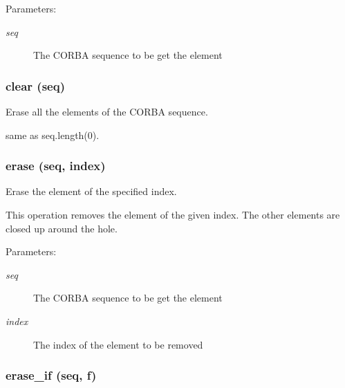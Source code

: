 \begin{Desc}
\item[Parameters:]
\begin{description}
\item[{\em seq}]The CORBA sequence to be get the element\end{description}
\end{Desc}
\subsubsection{\setlength{\rightskip}{0pt plus 5cm}clear (seq)}\label{CORBA__SeqUtil_8py_a9}


Erase all the elements of the CORBA sequence. 

same as seq.length(0).
\subsubsection{\setlength{\rightskip}{0pt plus 5cm}erase (seq, index)}\label{CORBA__SeqUtil_8py_a7}


Erase the element of the specified index. 

This operation removes the element of the given index. The other elements are closed up around the hole.

\begin{Desc}
\item[Parameters:]
\begin{description}
\item[{\em seq}]The CORBA sequence to be get the element \item[{\em index}]The index of the element to be removed\end{description}
\end{Desc}
\subsubsection{\setlength{\rightskip}{0pt plus 5cm}erase\_\-if (seq, f)}\label{CORBA__SeqUtil_8py_a8}


